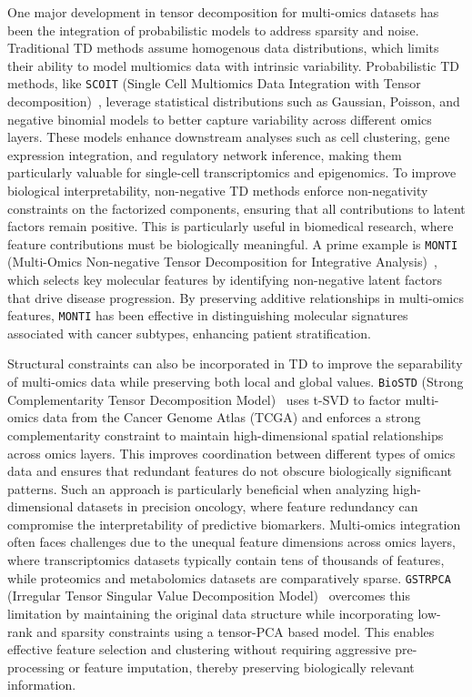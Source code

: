 One major development in tensor decomposition for multi-omics datasets has been the integration of probabilistic models to address sparsity and noise. Traditional TD methods assume homogenous data distributions, which limits their ability to model multiomics data with intrinsic variability. Probabilistic TD methods, like \texttt{SCOIT} (Single Cell Multiomics Data Integration with Tensor decomposition)~\cite{10.1093/nar/gkad570}, leverage statistical distributions such as Gaussian, Poisson, and negative binomial models to better capture variability across different omics layers. These models enhance downstream analyses such as cell clustering, gene expression integration, and regulatory network inference, making them particularly valuable for single-cell transcriptomics and epigenomics. To improve biological interpretability, non-negative TD methods enforce non-negativity constraints on the factorized components, ensuring that all contributions to latent factors remain positive. This is particularly useful in biomedical research, where feature contributions must be biologically meaningful. A prime example is \texttt{MONTI} (Multi-Omics Non-negative Tensor Decomposition for Integrative Analysis)~\cite{jung2021monti}, which selects key molecular features by identifying non-negative latent factors that drive disease progression. By preserving additive relationships in multi-omics features, \texttt{MONTI} has been effective in distinguishing molecular signatures associated with cancer subtypes, enhancing patient stratification.

Structural constraints can also be incorporated in TD to improve the separability of multi-omics data while preserving both local and global values. \texttt{BioSTD} (Strong Complementarity Tensor Decomposition Model)~\cite{gao2023biostd} uses t-SVD to factor multi-omics data from the Cancer Genome Atlas (TCGA) and enforces a strong complementarity constraint to maintain high-dimensional spatial relationships across omics layers. This improves coordination between different types of omics data and ensures that redundant features do not obscure biologically significant patterns. Such an approach is particularly beneficial when analyzing high-dimensional datasets in precision oncology, where feature redundancy can compromise the interpretability of predictive biomarkers. Multi-omics integration often faces challenges due to the unequal feature dimensions across omics layers, where transcriptomics datasets typically contain tens of thousands of features, while proteomics and metabolomics datasets are comparatively sparse. \texttt{GSTRPCA} (Irregular Tensor Singular Value Decomposition Model)~\cite{Cui2024GSTRPCA} overcomes this limitation by maintaining the original data structure while incorporating low-rank and sparsity constraints using a tensor-PCA based model. This enables effective feature selection and clustering without requiring aggressive pre-processing or feature imputation, thereby preserving biologically relevant information.

